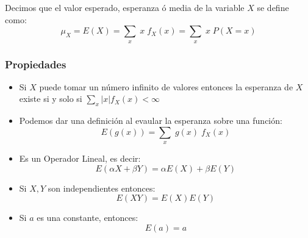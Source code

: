 \documentclass[12pt, fleqn]{report}                             %
\theoremstyle{break}                                            %
\begin{document}
                    Decimos que el valor esperado, esperanza ó media de la variable $X$
                    se define como:
                    \begin{equation*}
                        \mu_{X} = E(X) = \sum_x \; x \; f_X(x) = \sum_x \; x \; P(X = x)
                    \end{equation*}

                \subsubsection{Propiedades}

                    \begin{itemize}

                        \item 
                            Si $X$ puede tomar un número infinito de valores entonces la esperanza de 
                            $X$ existe si y solo si $\displaystyle \sum_x |x| f_X(x) < \infty$

                        \item
                            Podemos dar una definición al evaular la esperanza sobre una función:
                            \begin{equation*}
                                E(g(x)) = \sum_x \; g(x) \; f_X(x)    
                            \end{equation*}

                        \item Es un Operador Lineal, es decir:
                            \begin{equation*}
                                E(\alpha X + \beta Y) = \alpha E(X) + \beta E(Y)   
                            \end{equation*}

                        \item
                            Si $X, Y$ son independientes entonces:
                            \begin{equation*}
                                E(XY) = E(X) E(Y)  
                            \end{equation*}

                        \item
                            Si $a$ es una constante, entonces: 
                            \begin{equation*}
                                E(a) = a
                            \end{equation*}

                    \end{itemize}
\end{document}
